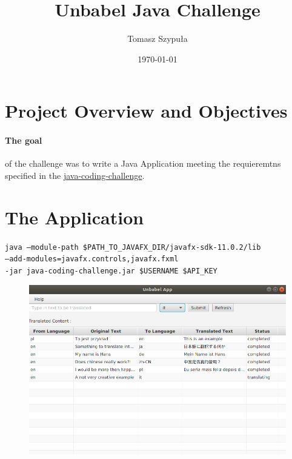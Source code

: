 \documentclass[12pt]{article}
\title{\Huge{Unbabel Java Challenge}}
\author{Tomasz Szypuła}
\date{\today}
\begin{document}
\maketitle
\section{Project Overview and Objectives }
\paragraph{The goal}of the challenge was to write a Java Application meeting the requieremtns specified in the \href{ https://github.com/Unbabel/java-coding-challenge}{java-coding-challenge}.

 


\section{The Application}
\texttt{java --module-path \$PATH\_TO\_JAVAFX\_DIR/javafx-sdk-11.0.2/lib \\--add-modules=javafx.controls,javafx.fxml \\-jar java-coding-challenge.jar \$USERNAME \$API\_KEY}

\begin{figure}
\includegraphics[scale=0.5]{appExample.png}
\end{figure}
\end{document}
